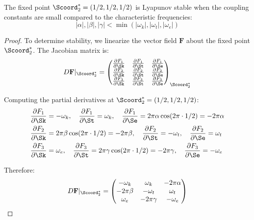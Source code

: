 \begin{proposition}
\label{prop:local_stability}
The fixed point $\Scoord_2^* = (1/2, 1/2, 1/2)$ is Lyapunov stable when the coupling constants are small compared to the characteristic frequencies:
\begin{equation}
|\alpha|, |\beta|, |\gamma| < \min(|\omega_k|, |\omega_t|, |\omega_e|)
\label{eq:stability_condition}
\end{equation}
\end{proposition}

\begin{proof}
To determine stability, we linearize the vector field $\mathbf{F}$ about the fixed point $\Scoord_2^*$. The Jacobian matrix is:
\begin{equation}
D\mathbf{F}|_{\Scoord_2^*} = \begin{pmatrix}
\frac{\partial F_1}{\partial \Sk} & \frac{\partial F_1}{\partial \St} & \frac{\partial F_1}{\partial \Se} \\
\frac{\partial F_2}{\partial \Sk} & \frac{\partial F_2}{\partial \St} & \frac{\partial F_2}{\partial \Se} \\
\frac{\partial F_3}{\partial \Sk} & \frac{\partial F_3}{\partial \St} & \frac{\partial F_3}{\partial \Se}
\end{pmatrix}_{\Scoord_2^*}
\end{equation}

Computing the partial derivatives at $\Scoord_2^* = (1/2, 1/2, 1/2)$:
\begin{align}
\frac{\partial F_1}{\partial \Sk} &= -\omega_k, \quad \frac{\partial F_1}{\partial \St} = \omega_k, \quad \frac{\partial F_1}{\partial \Se} = 2\pi\alpha \cos(2\pi \cdot 1/2) = -2\pi\alpha \\
\frac{\partial F_2}{\partial \Sk} &= 2\pi\beta \cos(2\pi \cdot 1/2) = -2\pi\beta, \quad \frac{\partial F_2}{\partial \St} = -\omega_t, \quad \frac{\partial F_2}{\partial \Se} = \omega_t \\
\frac{\partial F_3}{\partial \Sk} &= \omega_e, \quad \frac{\partial F_3}{\partial \St} = 2\pi\gamma \cos(2\pi \cdot 1/2) = -2\pi\gamma, \quad \frac{\partial F_3}{\partial \Se} = -\omega_e
\end{align}

Therefore:
\begin{equation}
D\mathbf{F}|_{\Scoord_2^*} = \begin{pmatrix}
-\omega_k & \omega_k & -2\pi\alpha \\
-2\pi\beta & -\omega_t & \omega_t \\
\omega_e & -2\pi\gamma & -\omega_e
\end{pmatrix}
\label{eq:jacobian}
\end{equation}


\end{proof}
